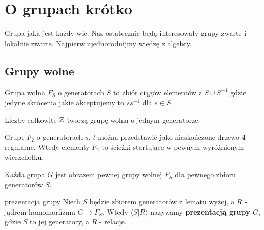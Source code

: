 \section{O grupach krótko}

Grupa jaka jest każdy wie. Nas ostatecznie będą interesowały grupy zwarte i lokalnie zwarte. Najpierw ujednorodnijmy wiedzę z algebry.

\subsection{Grupy wolne}

Grupa wolna $F_S$ o generatorach $S$ to zbiór ciągów elementów z $S\cup S^{-1}$ gdzie jedyne skrócenia jakie akceptujemy to $ss^{-1}$ dla $s\in S$.

\begin{example}[m]
  \item Liczby całkowite $\mathbb{Z}$ tworzą grupę wolną o jednym generatorze.
  \item Grupę $F_2$ o generatorach $s$, $t$ można przedstawić jako nieskończone drzewo $4$-regularne. Wtedy elementy $F_2$ to ścieżki startujące w pewnym wyróżnionym wierzchołku.
    \begin{center}
    \end{center}
\end{example}

\begin{lemma}{}{}
  Każda grupa $G$ jest obrazem pewnej grupy wolnej $F_S$ dla pewnego zbioru generatorów $S$.
\end{lemma}

\begin{definition}{prezentacja grupy}{}
  Niech $S$ będzie zbiorem generatorów z lematu wyżej, a $R$ - jądrem homomorfizmu $G\to F_S$. Wtedy $\langle S|R\rangle$ nazywamy \textbf{prezentacją grupy $G$}, gdzie $S$ to jej generatory, a $R$ - relacje.
\end{definition}


